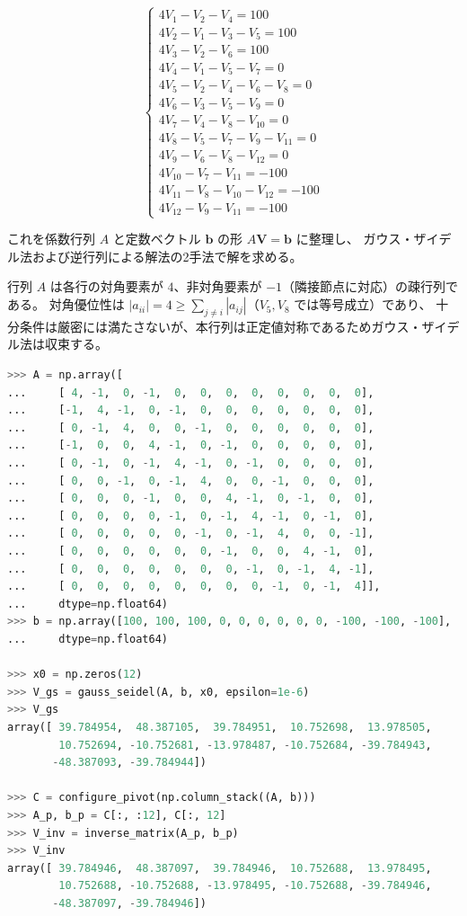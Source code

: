 \documentclass[12pt,a4paper]{ltjsreport}
\begin{document}
\begin{equation}
\begin{cases}
4V_1 - V_2 - V_4 = 100 \\
4V_2 - V_1 - V_3 - V_5 = 100 \\
4V_3 - V_2 - V_6 = 100 \\
4V_4 - V_1 - V_5 - V_7 = 0 \\
4V_5 - V_2 - V_4 - V_6 - V_8 = 0 \\
4V_6 - V_3 - V_5 - V_9 = 0 \\
4V_7 - V_4 - V_8 - V_{10} = 0 \\
4V_8 - V_5 - V_7 - V_9 - V_{11} = 0 \\
4V_9 - V_6 - V_8 - V_{12} = 0 \\
4V_{10} - V_7 - V_{11} = -100 \\
4V_{11} - V_8 - V_{10} - V_{12} = -100 \\
4V_{12} - V_9 - V_{11} = -100
\end{cases}
\end{equation}

これを係数行列 $A$ と定数ベクトル $\boldsymbol{b}$ の形 $A\boldsymbol{V} = \boldsymbol{b}$ に整理し、
ガウス・ザイデル法および逆行列による解法の2手法で解を求める。

行列 $A$ は各行の対角要素が $4$、非対角要素が $-1$（隣接節点に対応）の疎行列である。
対角優位性は $|a_{ii}| = 4 \geq \sum_{j \neq i}|a_{ij}|$（$V_5, V_8$ では等号成立）であり、
十分条件は厳密には満たさないが、本行列は正定値対称であるためガウス・ザイデル法は収束する。

\bigskip
\begin{lstlisting}[language=Python, numbers=none]
>>> A = np.array([
...     [ 4, -1,  0, -1,  0,  0,  0,  0,  0,  0,  0,  0],
...     [-1,  4, -1,  0, -1,  0,  0,  0,  0,  0,  0,  0],
...     [ 0, -1,  4,  0,  0, -1,  0,  0,  0,  0,  0,  0],
...     [-1,  0,  0,  4, -1,  0, -1,  0,  0,  0,  0,  0],
...     [ 0, -1,  0, -1,  4, -1,  0, -1,  0,  0,  0,  0],
...     [ 0,  0, -1,  0, -1,  4,  0,  0, -1,  0,  0,  0],
...     [ 0,  0,  0, -1,  0,  0,  4, -1,  0, -1,  0,  0],
...     [ 0,  0,  0,  0, -1,  0, -1,  4, -1,  0, -1,  0],
...     [ 0,  0,  0,  0,  0, -1,  0, -1,  4,  0,  0, -1],
...     [ 0,  0,  0,  0,  0,  0, -1,  0,  0,  4, -1,  0],
...     [ 0,  0,  0,  0,  0,  0,  0, -1,  0, -1,  4, -1],
...     [ 0,  0,  0,  0,  0,  0,  0,  0, -1,  0, -1,  4]],
...     dtype=np.float64)
>>> b = np.array([100, 100, 100, 0, 0, 0, 0, 0, 0, -100, -100, -100],
...     dtype=np.float64)

>>> x0 = np.zeros(12)
>>> V_gs = gauss_seidel(A, b, x0, epsilon=1e-6)
>>> V_gs
array([ 39.784954,  48.387105,  39.784951,  10.752698,  13.978505,
        10.752694, -10.752681, -13.978487, -10.752684, -39.784943,
       -48.387093, -39.784944])

>>> C = configure_pivot(np.column_stack((A, b)))
>>> A_p, b_p = C[:, :12], C[:, 12]
>>> V_inv = inverse_matrix(A_p, b_p)
>>> V_inv
array([ 39.784946,  48.387097,  39.784946,  10.752688,  13.978495,
        10.752688, -10.752688, -13.978495, -10.752688, -39.784946,
       -48.387097, -39.784946])
\end{lstlisting}
\end{document}
